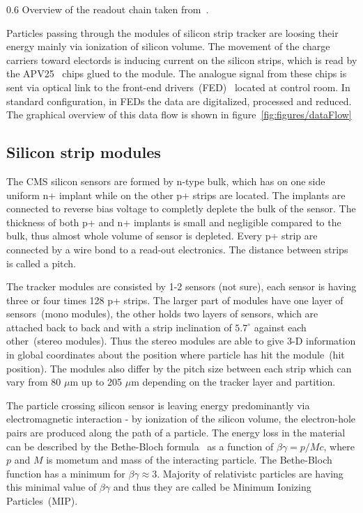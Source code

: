                  {0.6}       %
                 {Overview of the readout chain taken from~\cite{Bainbridge:2004jc}.} %

Particles passing through the modules of silicon strip tracker are loosing their energy mainly via ionization of silicon volume. The movement of the charge carriers toward electords is inducing current on the silicon strips, which is read by the APV25~\cite{French:2001xb} chips glued to the module. The analogue signal from these chips is sent via optical link to the front-end drivers~(FED)~\cite{Baird:2002wg} located at control room. In standard configuration, in FEDs the data are digitalized, processed and reduced. The graphical overview of this data flow is shown in figure~\ref{fig:figures/dataFlow}

\subsection{Silicon strip modules}

The CMS silicon sensors are formed by n-type bulk, which has on one side uniform n+ implant while on the other p+ strips are located. The implants are connected to reverse bias voltage to completly deplete the bulk of the sensor. The thickness of both p+ and n+ implants is small and negligible compared to the bulk, thus almost whole volume of sensor is depleted. Every p+ strip are connected by a wire bond to a read-out electronics. The distance between strips is called a pitch.

The tracker modules are consisted by 1-2 sensors (not sure), each sensor is having three or four times 128 p+ strips. The larger part of modules have one layer of sensors~(mono modules), the other holds two layers of sensors, which are attached back to back and with a strip inclination of $5.7^{\circ}$ against each other~(stereo modules). Thus the stereo modules are able to give 3-D information in global coordinates about the position where particle has hit the module~(hit position). The modules also differ by the pitch size between each strip which can vary from 80 $\mu$m up to 205 $\mu$m depending on the tracker layer and partition.

The particle crossing silicon sensor is leaving energy predominantly via electromagnetic interaction - by ionization of the silicon volume, the electron-hole pairs are produced along the path of a particle. The energy loss in the material can be described by the Bethe-Bloch formula~\cite{Groom:2000sm} as a function of $\beta\gamma = p/Mc$, where $p$ and $M$ is mometum and mass of the interacting particle. The Bethe-Bloch function has a minimum for $\beta\gamma \approx 3$. Majority of relativistc particles are having this minimal value of $\beta\gamma$ and thus they are called be Minimum Ionizing Particles~(MIP).


